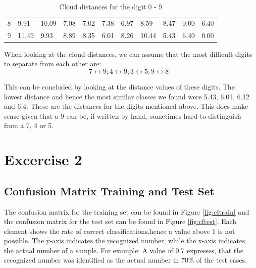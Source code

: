 \documentclass{article}
\begin{document}
\begin{table}[H]
\begin{tabular}{lllllllllll}
		\multicolumn{1}{l|}{8} & \multicolumn{1}{l|}{9.91}                         & \multicolumn{1}{l|}{10.09}                        & \multicolumn{1}{l|}{7.08}                         & \multicolumn{1}{l|}{7.02}                         & \multicolumn{1}{l|}{7.38}                         & \multicolumn{1}{l|}{6.97}                         & \multicolumn{1}{l|}{8.59}                         & \multicolumn{1}{l|}{8.47}                         & \multicolumn{1}{l|}{\cellcolor[HTML]{C0C0C0}0.00} & \multicolumn{1}{l|}{6.40}                         \\ \cline{2-11} 
		\multicolumn{1}{l|}{9} & \multicolumn{1}{l|}{11.49}                        & \multicolumn{1}{l|}{9.93}                         & \multicolumn{1}{l|}{8.89}                         & \multicolumn{1}{l|}{8.35}                         & \multicolumn{1}{l|}{6.01}                         & \multicolumn{1}{l|}{8.26}                         & \multicolumn{1}{l|}{10.44}                        & \multicolumn{1}{l|}{5.43}                         & \multicolumn{1}{l|}{6.40}                         & \multicolumn{1}{l|}{\cellcolor[HTML]{C0C0C0}0.00} \\ \cline{2-11} 	
	\end{tabular}
	\caption{Cloud distances for the digit 0 - 9}
	\label{table:distances}
\end{table}

When looking at the cloud distances, we can assume that the most difficult digits to separate from each other are: \[ 7 \leftrightarrow 9; 4 \leftrightarrow 9; 3 \leftrightarrow 5; 9 \leftrightarrow 8\]
 
This can be concluded by looking at the distance values of these digits. The lowest distance and hence the most similar classes we found were 5.43, 6.01, 6.12 and 6.4.
These are the distances for the digits mentioned above.
This does make sense given that a 9 can be, if written by hand, sometimes hard to distinguish from a 7, 4 or 5.

\newpage
\section{Excercise 2}
\subsection{Confusion Matrix Training and Test Set}
The confusion matrix for the training set can be found in Figure \ref{fig:cftrain} and the confusion matrix for the test set can be found in Figure \ref{fig:cftest}.
Each element shows the rate of correct classifications,hence a value above 1 is not possible.
The y-axis indicates the recognized number, while the x-axis indicates the actual number of a sample.
For example: A value of 0.7 expresses, that the recognized number was identified as the actual number in 70\% of the test cases.
\end{document}
